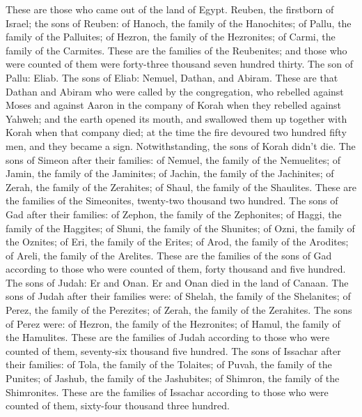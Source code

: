 These are those who came out of the land of Egypt.  Reuben,
the firstborn of Israel; the sons of Reuben: of Hanoch, the family of
the Hanochites; of Pallu, the family of the Palluites;  of
Hezron, the family of the Hezronites; of Carmi, the family of the
Carmites.  These are the families of the Reubenites; and
those who were counted of them were forty-three thousand seven hundred
thirty.  The son of Pallu: Eliab.  The sons of
Eliab: Nemuel, Dathan, and Abiram. These are that Dathan and Abiram who
were called by the congregation, who rebelled against Moses and against
Aaron in the company of Korah when they rebelled against Yahweh;
 and the earth opened its mouth, and swallowed them up
together with Korah when that company died; at the time the fire
devoured two hundred fifty men, and they became a sign. 
Notwithstanding, the sons of Korah didn't die.  The sons of
Simeon after their families: of Nemuel, the family of the Nemuelites; of
Jamin, the family of the Jaminites; of Jachin, the family of the
Jachinites;  of Zerah, the family of the Zerahites; of
Shaul, the family of the Shaulites.  These are the families
of the Simeonites, twenty-two thousand two hundred.  The
sons of Gad after their families: of Zephon, the family of the
Zephonites; of Haggi, the family of the Haggites; of Shuni, the family
of the Shunites;  of Ozni, the family of the Oznites; of
Eri, the family of the Erites;  of Arod, the family of the
Arodites; of Areli, the family of the Arelites.  These are
the families of the sons of Gad according to those who were counted of
them, forty thousand and five hundred.  The sons of Judah:
Er and Onan. Er and Onan died in the land of Canaan.  The
sons of Judah after their families were: of Shelah, the family of the
Shelanites; of Perez, the family of the Perezites; of Zerah, the family
of the Zerahites.  The sons of Perez were: of Hezron, the
family of the Hezronites; of Hamul, the family of the Hamulites.
 These are the families of Judah according to those who
were counted of them, seventy-six thousand five hundred. 
The sons of Issachar after their families: of Tola, the family of the
Tolaites; of Puvah, the family of the Punites;  of Jashub,
the family of the Jashubites; of Shimron, the family of the Shimronites.
 These are the families of Issachar according to those who
were counted of them, sixty-four thousand three hundred. 
